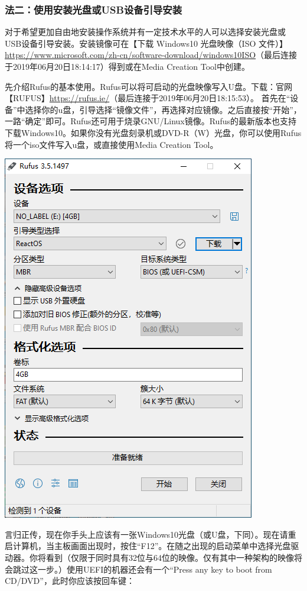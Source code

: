 \subsubsection{法二：使用安装光盘或USB设备引导安装}
对于希望更加自由地安装操作系统并有一定技术水平的人可以选择安装光盘或USB设备引导安装。安装镜像可在【下载 Windows10 光盘映像（ISO 文件）】\url{https://www.microsoft.com/zh-cn/software-download/windows10ISO}（最后连接于2019年06月20日18:14:17）得到或在Media Creation Tool中创建。\par
先介绍Rufus的基本使用。Rufus可以将可启动的光盘映像写入U盘。下载：官网【RUFUS】\url{https://rufus.ie/}（最后连接于2019年06月20日18:15:53）。
首先在“设备”中选择你的u盘，引导选择“镜像文件”，再选择对应镜像。之后直接按“开始”，一路“确定”即可。Rufus还可用于烧录GNU/Linux镜像。Rufus的最新版本也支持下载Windows10。如果你没有光盘刻录机或DVD-R（W）光盘，你可以使用Rufus将一个iso文件写入u盘，或直接使用Media Creation Tool。
\begin{center}
	\includegraphics[scale=0.6]{pic/Rufus}	
\end{center} \par
言归正传，现在你手头上应该有一张Windows10光盘（或U盘，下同）。现在请重启计算机，当主板画面出现时，按住“F12”。在随之出现的启动菜单中选择光盘驱动器。你将看到（仅限于同时具有32位与64位的映像。仅有其中一种架构的映像将会跳过这一步。）使用UEFI的机器还会有一个“Press any key to boot from CD/DVD”，此时你应该按回车键：
